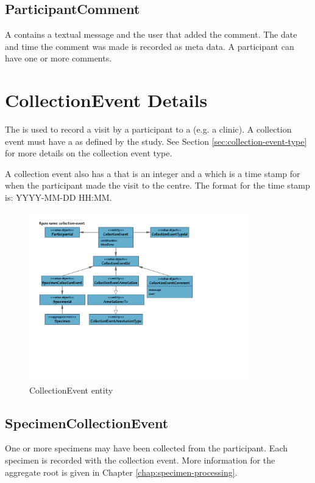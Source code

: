 \subsection*{ParticipantComment}
A  contains a textual message and the user
that added the comment. The date and time the comment was made is recorded as
meta data. A participant can have one or more comments.

\section{CollectionEvent Details}
The  is used to record a visit by a participant
to a  (e.g. a clinic). A collection event must have a
 as defined by the study. See Section
\ref{sec:collection-event-type} for more details on the collection event type.

A collection event also has a  that is an integer and a
 which is a time stamp for when the participant made the
visit to the centre. The format for the time stamp is: YYYY-MM-DD HH:MM.

\begin{figure}[H]
  \centering
  \includegraphics[trim={10mm 72mm 70mm 18mm}, clip,
    width=0.85\textwidth]{images/collection-event}
  \caption{CollectionEvent entity}
  \label{fig:collection-event}
\end{figure}

\subsection*{SpecimenCollectionEvent}
One or more specimens may have been collected from the participant. Each
specimen is recorded with the collection event. More information for the
 aggregate root is given in Chapter
\ref{chap:specimen-processing}.

